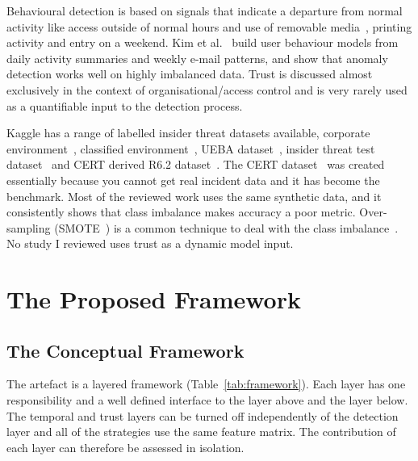 \documentclass[a4paper,12pt]{article}
\begin{document}
Behavioural detection is based on signals that indicate a departure from normal activity like access outside of normal hours and use of removable media~\cite{ibraheem2025}, printing activity and entry on a weekend. Kim et al.~\cite{kim2019} build user behaviour models from daily activity summaries and weekly e-mail patterns, and show that anomaly detection works well on highly imbalanced data. Trust is discussed almost exclusively in the context of organisational/access control and is very rarely used as a quantifiable input to the detection process.

Kaggle has a range of labelled insider threat datasets available, corporate environment~\cite{zaki2024}, classified environment~\cite{kaggle_classified2024}, UEBA dataset~\cite{kaggle_ueba2024}, insider threat test dataset~\cite{kaggle_testdataset} and CERT derived R6.2 dataset~\cite{kaggle_r62}. The CERT dataset~\cite{glasser2013} was created essentially because you cannot get real incident data and it has become the benchmark. Most of the reviewed work uses the same synthetic data, and it consistently shows that class imbalance makes accuracy a poor metric. Over-sampling (SMOTE~\cite{chawla2002}) is a common technique to deal with the class imbalance~\cite{alzaabi2024}. No study I reviewed uses trust as a dynamic model input.

\section{The Proposed Framework}
\label{sec:6}

\subsection{The Conceptual Framework}
\label{sec:6.1}

The artefact is a layered framework (Table~\ref{tab:framework}). Each layer has one responsibility and a well defined interface to the layer above and the layer below. The temporal and trust layers can be turned off independently of the detection layer and all of the strategies use the same feature matrix. The contribution of each layer can therefore be assessed in isolation.
\end{document}
